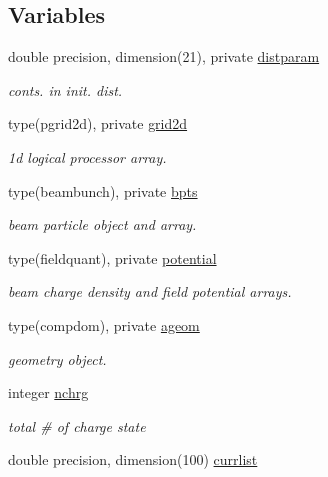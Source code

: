 \subsection*{Variables}
\begin{DoxyCompactItemize}
\item 
double precision, dimension(21), private \mbox{\hyperlink{namespaceaccsimulatorclass_a1b6defb6bd9b1c4ddada0b30c99f4dd5}{distparam}}
\begin{DoxyCompactList}\small\item\em conts. in init. dist. \end{DoxyCompactList}\item 
type(pgrid2d), private \mbox{\hyperlink{namespaceaccsimulatorclass_a7fbad7f6e18df1ec95d1f76620a8bd80}{grid2d}}
\begin{DoxyCompactList}\small\item\em 1d logical processor array. \end{DoxyCompactList}\item 
type(beambunch), private \mbox{\hyperlink{namespaceaccsimulatorclass_a4d06760340147c29a3ce5ba4f4ba9066}{bpts}}
\begin{DoxyCompactList}\small\item\em beam particle object and array. \end{DoxyCompactList}\item 
type(fieldquant), private \mbox{\hyperlink{namespaceaccsimulatorclass_a2d7cf949e4c05edf370cfbb6ee936951}{potential}}
\begin{DoxyCompactList}\small\item\em beam charge density and field potential arrays. \end{DoxyCompactList}\item 
type(compdom), private \mbox{\hyperlink{namespaceaccsimulatorclass_ac6dafc4c6322db3e6507ece8c3ff9e37}{ageom}}
\begin{DoxyCompactList}\small\item\em geometry object. \end{DoxyCompactList}\item 
integer \mbox{\hyperlink{namespaceaccsimulatorclass_ac4f089e8c954990197b1d251b800692f}{nchrg}}
\begin{DoxyCompactList}\small\item\em total \# of charge state \end{DoxyCompactList}\item 
double precision, dimension(100) \mbox{\hyperlink{namespaceaccsimulatorclass_a8c7c321579304f645389a08a8725f241}{currlist}}

\end{DoxyCompactItemize}
